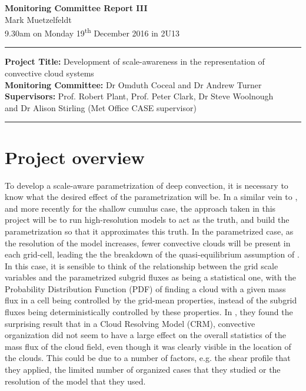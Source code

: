 \documentclass[11pt,a4paper]{article}
\newcommand{\ts}{\textsuperscript}
\begin{document}

\begin{center}
    \Large{\textbf{Monitoring Committee Report III}}\\[0.1cm]
    \large{Mark Muetzelfeldt}\\
    \normalsize{9.30am on Monday 19\ts{th} December 2016 in 2U13}\\[0.1cm]		
    \rule{\textwidth}{0.2mm}
    \textbf{Project Title: }Development of scale-awareness in the representation of
    convective cloud systems\\
    \textbf{Monitoring Committee: }Dr Omduth Coceal and  Dr Andrew Turner\\
    \textbf{Supervisors: }Prof. Robert Plant, Prof. Peter Clark, Dr Steve Woolnough \\
    and Dr Alison Stirling (Met Office CASE supervisor)\\
    \rule{\textwidth}{0.2mm}
\end{center}

\section{Project overview}
\label{sec:Project Overview}

To develop a scale-aware parametrization of deep convection, it is necessary to know what the desired effect of the parametrization will be. In a similar vein to \cite{plant2008stochastic}, and more recently \cite{sakradzija2016stochastic} for the shallow cumulus case, the approach taken in this project will be to run high-resolution models to act as the truth, and build the parametrization so that it approximates this truth. In the parametrized case, as the resolution of the model increases, fewer convective clouds will be present in each grid-cell, leading the the breakdown of the quasi-equilibrium assumption of \cite{arakawa1974interaction}. In this case, it is sensible to think of the relationship between the grid scale variables and the parametrized subgrid fluxes as being a statistical one, with the Probability Distribution Function (PDF) of finding a cloud with a given mass flux in a cell being controlled by the grid-mean properties, instead of the subgrid fluxes being deterministically controlled by these properties. In \cite{cohen2006fluctuations}, they found the surprising result that in a Cloud Resolving Model (CRM), convective organization did not seem to have a large effect on the overall statistics of the mass flux of the cloud field, even though it was clearly visible in the location of the clouds. This could be due to a number of factors, e.g. the shear profile that they applied, the limited number of organized cases that they studied or the resolution of the model that they used.
\end{document}
